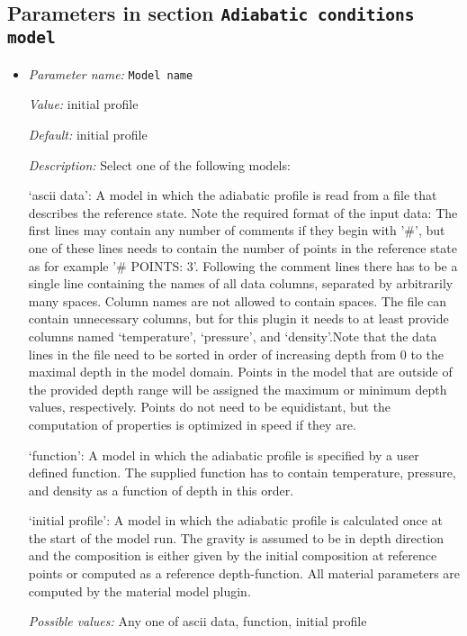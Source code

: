 \subsection{Parameters in section \tt Adiabatic conditions model}
\label{parameters:Adiabatic_20conditions_20model}

\begin{itemize}
\item {\it Parameter name:} {\tt Model name}
\label{parameters:Adiabatic conditions model/Model name}


{\it Value:} initial profile


{\it Default:} initial profile


{\it Description:} Select one of the following models:

`ascii data': A model in which the adiabatic profile is read from a file that describes the reference state. Note the required format of the input data: The first lines may contain any number of comments if they begin with '\#', but one of these lines needs to contain the number of points in the reference state as for example '\# POINTS: 3'. Following the comment lines there has to be a single line containing the names of all data columns, separated by arbitrarily many spaces. Column names are not allowed to contain spaces. The file can contain unnecessary columns, but for this plugin it needs to at least provide columns named `temperature', `pressure', and `density'.Note that the data lines in the file need to be sorted in order of increasing depth from 0 to the maximal depth in the model domain. Points in the model that are outside of the provided depth range will be assigned the maximum or minimum depth values, respectively. Points do not need to be equidistant, but the computation of properties is optimized in speed if they are.

`function': A model in which the adiabatic profile is specified by a user defined function. The supplied function has to contain temperature, pressure, and density as a function of depth in this order.

`initial profile': A model in which the adiabatic profile is calculated once at the start of the model run. The gravity is assumed to be in depth direction and the composition is either given by the initial composition at reference points or computed as a reference depth-function. All material parameters are computed by the material model plugin.


{\it Possible values:} Any one of ascii data, function, initial profile
\end{itemize}



